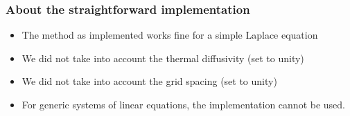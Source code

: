 \documentclass[11pt,table,final,xcolor={usenames,dvipsnames,table}]{beamer}
\begin{document}
\begin{frame}[fragile]
  \frametitle{About the straightforward implementation}
  \begin{itemize}
   \item The method as implemented works fine for a simple Laplace equation
   \item We did not take into account the thermal diffusivity (set to unity)
   \item We did not take into account the grid spacing (set to unity)
   \item For generic systems of linear equations, the implementation cannot be used.
  \end{itemize}
\end{frame}
\end{document}
